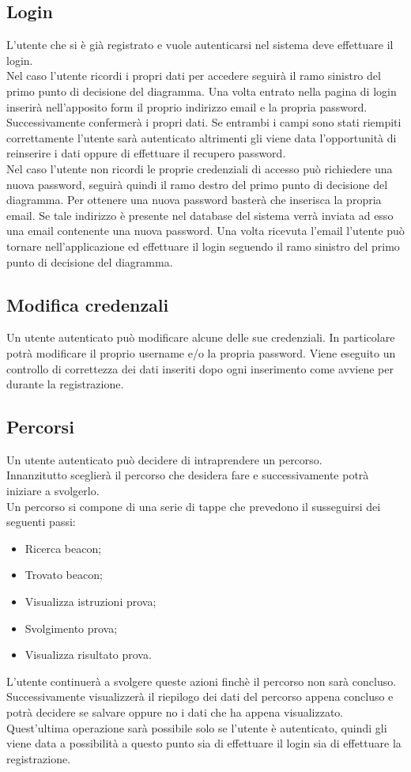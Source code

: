 \subsection{Login}
L'utente che si è già registrato e vuole autenticarsi nel sistema deve effettuare il login. \\
Nel caso l'utente ricordi i propri dati per accedere seguirà il ramo sinistro del primo punto di decisione del diagramma. Una volta entrato nella pagina di login inserirà nell'apposito form il proprio indirizzo email e la propria password. Successivamente confermerà i propri dati. Se entrambi i campi sono stati riempiti correttamente l'utente sarà autenticato altrimenti gli viene data l'opportunità di reinserire i dati oppure di effettuare il recupero password. \\
Nel caso l'utente non ricordi le proprie credenziali di accesso può richiedere una nuova password, seguirà quindi il ramo destro del primo punto di decisione del diagramma. Per ottenere una nuova password basterà che inserisca la propria email. Se tale indirizzo è presente nel database del sistema verrà inviata ad esso una email contenente una nuova password. Una volta ricevuta l'email l'utente può tornare nell'applicazione ed effettuare il login seguendo il ramo sinistro del primo punto di decisione del diagramma.

\subsection{Modifica credenzali}
Un utente autenticato può modificare alcune delle sue credenziali. In particolare potrà modificare il proprio username e/o la propria password.
Viene eseguito un controllo di correttezza dei dati inseriti dopo ogni inserimento come avviene per durante la registrazione.

\subsection{Percorsi}
Un utente autenticato può decidere di intraprendere un percorso. \\ 
Innanzitutto sceglierà il percorso che desidera fare e successivamente potrà iniziare a svolgerlo. \\ Un percorso si compone di una serie di tappe che prevedono il susseguirsi dei seguenti passi:
\begin{itemize}
	\item Ricerca beacon;
	\item Trovato beacon;
	\item Visualizza istruzioni prova;
	\item Svolgimento prova;
	\item Visualizza risultato prova.
\end{itemize}
L'utente continuerà a svolgere queste azioni finchè il percorso non sarà concluso. Successivamente visualizzerà il riepilogo dei dati del percorso appena concluso e potrà decidere se salvare oppure no i dati che ha appena visualizzato. Quest'ultima operazione sarà possibile solo se l'utente è autenticato, quindi gli viene data a possibilità a questo punto sia di effettuare il login sia di effettuare la registrazione.

